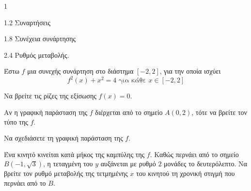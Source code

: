 \begin{ylh}{1}
    \item 1.2 Συναρτήσεις
    \item 1.8 Συνέχεια συνάρτησης
    \item 2.4 Ρυθμός μεταβολής.
\end{ylh}
Έστω $f$ μια συνεχής συνάρτηση στο διάστημα $[-2,2]$, για την οποία ισχύει
\[ f^2(x) + x^2 = 4 \text{ για κάθε } x \in [-2,2] \]

\begin{alist}
\item Να βρείτε τις ρίζες της εξίσωσης $f(x) = 0$. 
\item Αν η γραφική παράσταση της $f$ διέρχεται από το σημείο $A(0,2)$, τότε να βρείτε τον τύπο της $f$. 
\item Να σχεδιάσετε τη γραφική παράσταση της $f$. 
\item Ένα κινητό κινείται κατά μήκος της καμπύλης της $f$. Καθώς περνάει από το σημείο $B(-1, \sqrt{3})$, η τεταγμένη του $y$ αυξάνεται με ρυθμό $2$ μονάδες το δευτερόλεπτο. Να βρείτε τον ρυθμό μεταβολής της τετμημένης $x$ του κινητού τη χρονική στιγμή που περνάει από το $B$. 
\end{alist}